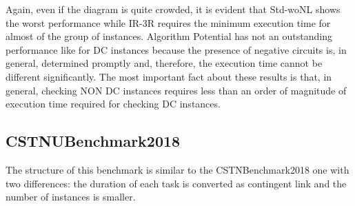 \documentclass[a4paper,11pt]{article}
\begin{document}
Again, even if the diagram is quite crowded, it is evident that \textrm{Std-woNL} shows the worst performance while
\textrm{IR-3R} requires the minimum execution time for almost of the group of instances.
Algorithm \textrm{Potential} has not an outstanding performance like for DC instances because the presence of negative circuits is, in general, determined promptly and, therefore, the execution time cannot be different significantly.
The most important fact about these results is that, in general, checking NON DC instances requires
less than an order of magnitude of execution time required for checking DC instances.




\subsection{CSTNUBenchmark2018}

The structure of this benchmark is similar to the CSTNBenchmark2018 one with two differences: the duration of each task is converted as contingent link and the number of instances is smaller.
\end{document}
